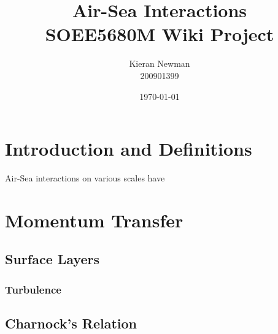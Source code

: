 \documentclass{report}
\begin{document}
  
  \title{Air-Sea Interactions\\SOEE5680M Wiki Project} 
  \author{Kieran Newman\\200901399}
  \date{\small\today}
  \maketitle
  
  \ifdefined\HCode
  \fi
  
  \tableofcontents
  
  \ifdefined\HCode
  \fi
  
  \chapter{Introduction and Definitions} 
  \ifdefined\HCode
  \else
  {
  \startcontents[chapter]
  }
  \fi
    \lipsum[10]

  
   
  \ifdefined\HCode
  \fi
  
  \ifdefined\HCode
  \else
  {
  \stopcontents[chapter]
  } 
  \fi
  
 Air-Sea interactions on various scales have 
  \chapter{Momentum Transfer}
    \lipsum[10]
  
    \section{Surface Layers}
    \lipsum[1-2]

   \subsection{Turbulence} 
    \lipsum[1-2]

    \section{Charnock's Relation}
    \lipsum[1-2]
  
\end{document}
